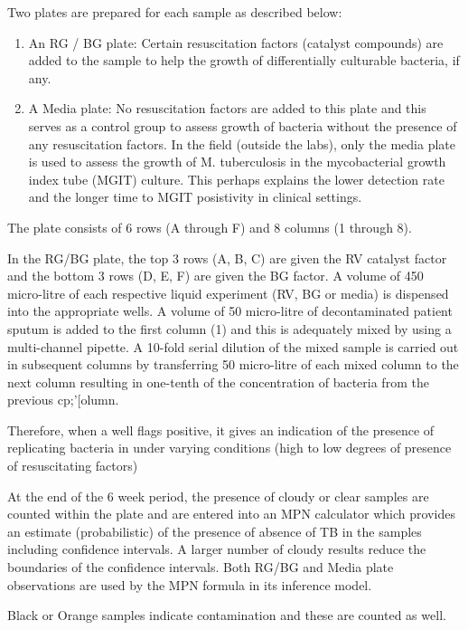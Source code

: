 \documentclass[a4paper,twoside,12pt]{report}
\begin{document}
Two plates are prepared for each sample as described below:
\begin{enumerate}
\item An RG / BG plate: Certain resuscitation factors (catalyst compounds) are added to the sample to help the growth of differentially culturable bacteria, if any.  
\item A Media plate: No resuscitation factors are added to this plate and this serves as a control group to assess growth of bacteria without the presence of any resuscitation factors.   In the field (outside the labs), only the media plate is used to assess the growth of M. tuberculosis in the mycobacterial growth index tube (MGIT) culture. This perhaps explains the lower detection rate and the longer time to MGIT posistivity in clinical settings.
\end{enumerate}

The plate consists of 6 rows (A through F) and 8 columns (1 through 8).    

In the RG/BG plate, the top 3 rows (A, B, C) are given the RV catalyst factor and the bottom 3 rows (D, E, F) are given the BG factor.  A volume of 450 micro-litre of each respective liquid experiment (RV, BG or media) is dispensed into the appropriate wells. A volume of 50 micro-litre of decontaminated patient sputum is added to the first column (1) and this is adequately mixed by using a multi-channel pipette. A 10-fold serial dilution of the mixed sample is carried out in subsequent columns by transferring 50 micro-litre of each mixed column to the next column resulting in one-tenth of the concentration of bacteria from the previous cp;'[olumn.    

Therefore, when a well flags positive, it gives an indication of the presence of replicating bacteria in under varying conditions (high to low degrees of presence of resuscitating factors)

At the end of the 6 week period, the presence of cloudy or clear samples are counted within the plate and are entered into an MPN calculator which provides an estimate (probabilistic) of the presence of absence of TB in the samples including confidence intervals.    A larger number of cloudy results reduce the boundaries of the confidence intervals. Both RG/BG and Media plate observations are used by the MPN formula in its inference model. 

Black or Orange samples indicate contamination and these are counted as well. 
\setlength{\fboxsep}{0pt}%
\setlength{\fboxrule}{1.5pt}%
\end{document}

